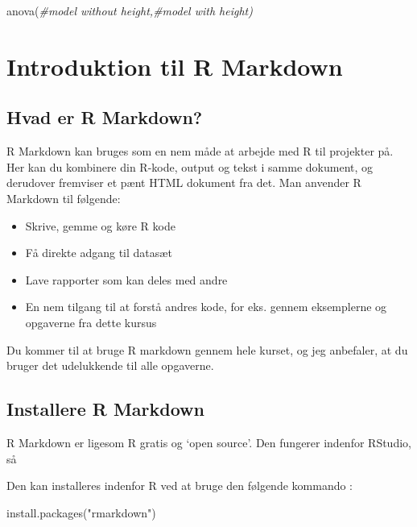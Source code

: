 \documentclass[
]{book}
\newenvironment{Shaded}{\begin{snugshade}}{\end{snugshade}}
\newcommand{\CommentTok}[1]{\textcolor[rgb]{0.56,0.35,0.01}{\textit{#1}}}
\newcommand{\FunctionTok}[1]{\textcolor[rgb]{0.00,0.00,0.00}{#1}}
\newcommand{\NormalTok}[1]{#1}
\newcommand{\StringTok}[1]{\textcolor[rgb]{0.31,0.60,0.02}{#1}}
\providecommand{\tightlist}{%
  \setlength{\itemsep}{0pt}\setlength{\parskip}{0pt}}
\begin{document}
\begin{Shaded}
\begin{Highlighting}[]
\FunctionTok{anova}\NormalTok{(}\CommentTok{\#model without height,\#model with height)}
\end{Highlighting}
\end{Shaded}

\hypertarget{introduktion}{%
\chapter{Introduktion til R Markdown}\label{introduktion}}

\hypertarget{hvad-er-r-markdown}{%
\section{Hvad er R Markdown?}\label{hvad-er-r-markdown}}

R Markdown kan bruges som en nem måde at arbejde med R til projekter på. Her kan du kombinere din R-kode, output og tekst i samme dokument, og derudover fremviser et pænt HTML dokument fra det. Man anvender R Markdown til følgende:

\begin{itemize}
\tightlist
\item
  Skrive, gemme og køre R kode
\item
  Få direkte adgang til datasæt
\item
  Lave rapporter som kan deles med andre
\item
  En nem tilgang til at forstå andres kode, for eks. gennem eksemplerne og opgaverne fra dette kursus
\end{itemize}

Du kommer til at bruge R markdown gennem hele kurset, og jeg anbefaler, at du bruger det udelukkende til alle opgaverne.

\hypertarget{installere-r-markdown}{%
\section{Installere R Markdown}\label{installere-r-markdown}}

R Markdown er ligesom R gratis og `open source'. Den fungerer indenfor RStudio, så

Den kan installeres indenfor R ved at bruge den følgende kommando
:

\begin{Shaded}
\begin{Highlighting}[]
\FunctionTok{install.packages}\NormalTok{(}\StringTok{"rmarkdown"}\NormalTok{)}
\end{Highlighting}
\end{Shaded}
\end{document}
